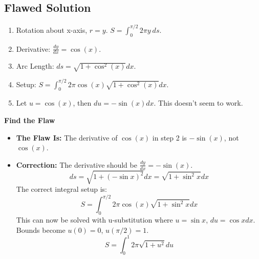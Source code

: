 \documentclass{article}
\begin{document}
\subsection{Flawed Solution}
\begin{enumerate}
    \item Rotation about x-axis, \(r=y\). \(S = \int_0^{\pi/2} 2\pi y \ ds\).
    \item Derivative: \(\frac{dy}{dx} = \cos(x)\).
    \item Arc Length: \(ds = \sqrt{1+\cos^2(x)} dx\).
    \item Setup: \(S = \int_0^{\pi/2} 2\pi \cos(x) \sqrt{1+\cos^2(x)} dx\).
    \item Let \(u=\cos(x)\), then \(du=-\sin(x)dx\). This doesn't seem to work.
\end{enumerate}
\textbf{Find the Flaw}
\begin{itemize}
    \item \textbf{The Flaw Is:} The derivative of \(\cos(x)\) in step 2 is \(-\sin(x)\), not \(\cos(x)\).
    \item \textbf{Correction:} The derivative should be \(\frac{dy}{dx}=-\sin(x)\).
    \[ ds = \sqrt{1+(-\sin x)^2}dx = \sqrt{1+\sin^2 x}dx \]
    The correct integral setup is:
    \[ S = \int_0^{\pi/2} 2\pi \cos(x) \sqrt{1+\sin^2 x} dx \]
    This can now be solved with u-substitution where \(u=\sin x\), \(du=\cos x dx\).
    Bounds become \(u(0)=0\), \(u(\pi/2)=1\).
    \[ S = \int_0^1 2\pi \sqrt{1+u^2} du \]
\end{itemize}
\end{document}
